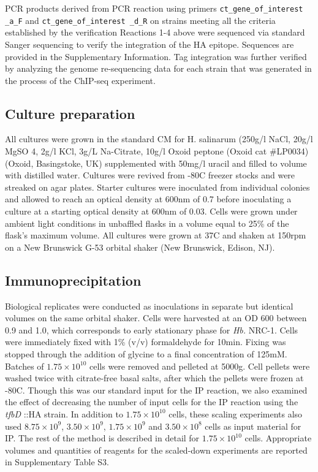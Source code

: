 PCR products derived from PCR reaction using primers {\tt ct\_gene\_of\_interest \_a\_F} and {\tt ct\_gene\_of\_interest \_d\_R} on strains meeting all the criteria established by the verification Reactions 1-4 above were sequenced via standard Sanger sequencing to verify the integration of the HA epitope. Sequences are provided in the Supplementary Information. Tag integration was further verified by analyzing the genome re-sequencing data for each strain that was generated in the process of the ChIP-seq experiment.

\subsection{Culture preparation}

All cultures were grown in the standard CM for H. salinarum (250g/l NaCl, 20g/l MgSO 4, 2g/l KCl, 3g/L Na-Citrate, 10g/l Oxoid peptone (Oxoid cat \#LP0034) (Oxoid, Basingstoke, UK) supplemented with 50mg/l uracil and filled to volume with distilled water. Cultures were revived from -80\degree C freezer stocks and were streaked on agar plates. Starter cultures were inoculated from individual colonies and allowed to reach an optical density at 600nm of 0.7 before inoculating a culture at a starting optical density at 600nm of 0.03. Cells were grown under ambient light conditions in unbaffled flasks in a volume equal to 25\% of the flask's maximum volume. All cultures were grown at 37\degree C and shaken at 150rpm on a New Brunswick G-53 orbital shaker (New Brunswick, Edison, NJ).

\subsection{Immunoprecipitation}

Biological replicates were conducted as inoculations in separate but identical volumes on the same orbital shaker. Cells were harvested at an OD 600 between 0.9 and 1.0, which corresponds to early stationary phase for {\em Hb.} NRC-1. Cells were immediately fixed with 1\% (v/v) formaldehyde for 10min. Fixing was stopped through the addition of glycine to a final concentration of 125mM. Batches of $1.75 \times 10^{10}$ cells were removed and pelleted at 5000g. Cell pellets were washed twice with citrate-free basal salts, after which the pellets were frozen at -80\degree C. Though this was our standard input for the IP reaction, we also examined the effect of decreasing the number of input cells for the IP reaction using the {\em tfbD} ::HA strain. In addition to $1.75 \times 10^{10}$ cells, these scaling experiments also used $8.75 \times 10^9$, $3.50 \times 10^9$, $1.75 \times 10^9$ and $3.50 \times 10^8$ cells as input material for IP. The rest of the method is described in detail for $1.75 \times 10^{10}$ cells. Appropriate volumes and quantities of reagents for the scaled-down experiments are reported in Supplementary Table S3.

